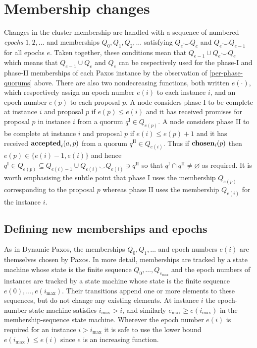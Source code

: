 \documentclass[journal]{IEEEtran}
\begin{document}
\section{Membership changes}\label{membership-changes}

Changes in the cluster membership are handled with a sequence of numbered
\textit{epochs} $1, 2, \ldots$ and memberships $Q_0, Q_1, Q_2, \ldots$
satisfying $Q_e \smile Q_e$ and $Q_e \smile Q_{e-1}$ for all epochs $e$.  Taken
together, these conditions mean that $Q_{e-1} \cup Q_e \smile Q_e$ which means
that $Q_{e-1} \cup Q_e$ and $Q_e$ can be respectively used for the phase-I and
phase-II memberships of each Paxos instance by the observation of
\ref{per-phase-quorums} above.  There are also two nondecreasing functions,
both written $e(\cdot)$, which respectively assign an epoch number $e(i)$ to each
instance $i$, and an epoch number $e(p)$ to each proposal $p$. A node considers
phase I to be complete at instance $i$ and proposal $p$ if $e(p) \le e(i)$ and
it has received promises for proposal $p$ in instance $i$ from a quorum
$q^\textrm{I} \in Q_{e(p)}$. A node considers phase II to be complete at
instance $i$ and proposal $p$ if $e(i) \le e(p)+1$ and it has received
$\mathbf{accepted}_{i}(a,p)$ from a quorum $q^\textrm{II} \in Q_{e(i)}$.  Thus if
$\mathbf{chosen}_{i}(p)$ then $e(p) \in \{ e(i)-1, e(i) \}$ and hence $q^\textrm{I} \in
Q_{e(p)} \subseteq Q_{e(i)-1} \cup Q_{e(i)} \smile Q_{e(i)} \ni q^\textrm{II}$
so that $q^\textrm{I} \cap q^\textrm{II} \ne \varnothing$ as required. It is
worth emphasising the subtle point that phase I uses the membership $Q_{e(p)}$
corresponding to the proposal $p$ whereas phase II uses the membership
$Q_{e(i)}$ for the instance $i$.

\subsection{Defining new memberships and epochs}

As in Dynamic Paxos, the memberships $Q_0, Q_1, \ldots$ and epoch numbers
$e(i)$ are themselves chosen by Paxos. In more detail, memberships are tracked
by a state machine whose state is the finite sequence $Q_0, \ldots,
Q_{e_\mathrm{max}}$ and the epoch numbers of instances are tracked by a state
machine whose state is the finite sequence $e(0), \ldots, e(i_\mathrm{max})$.
Their transitions append one or more elements to these sequences, but do not
change any existing elements. At instance $i$ the epoch-number state machine
satisfies $i_\mathrm{max} > i$, and similarly $e_\mathrm{max} \ge
e(i_\mathrm{max})$ in the membership-sequence state machine.  Wherever the
epoch number $e(i)$ is required for an instance $i > i_\mathrm{max}$ it is safe
to use the lower bound $e(i_\mathrm{max}) \le e(i)$ since $e$ is an increasing
function.
\end{document}
